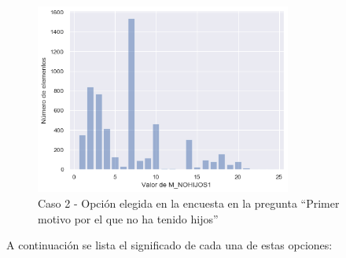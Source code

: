 \documentclass[a4paper, 20pt]{article}
\begin{document}
\begin{figure}[H]
    \centering
    \includegraphics[width=0.75\textwidth]{./caso2/M_NOHIJOS1_tam}
    \caption{Caso 2 - Opción elegida en la encuesta en la pregunta ``Primer motivo por el que no ha tenido hijos''}
    \label{fig:m_nohijos}
\end{figure}

A continuación se lista el significado de cada una de estas opciones:
\end{document}
